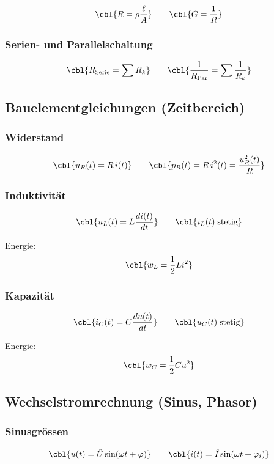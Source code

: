 \[
\cbl{R = \rho \frac{\ell}{A}}
\qquad
\cbl{G = \frac{1}{R}}
\]

\subsubsection{Serien- und Parallelschaltung}

\[
\cbl{R_{\mathrm{Serie}} = \sum R_k}
\qquad
\cbl{\frac{1}{R_{\mathrm{Par}}} = \sum \frac{1}{R_k}}
\]

\subsection{Bauelementgleichungen (Zeitbereich)}

\subsubsection{Widerstand}

\[
\cbl{u_R(t) = R\, i(t)}
\qquad
\cbl{p_R(t) = R\, i^2(t) = \frac{u_R^2(t)}{R}}
\]

\subsubsection{Induktivität}

\[
\cbl{u_L(t) = L \frac{di(t)}{dt}}
\qquad
\cbl{i_L(t) \;\text{stetig}}
\]

Energie:
\[
\cbl{w_L = \frac{1}{2} L i^2}
\]

\subsubsection{Kapazität}

\[
\cbl{i_C(t) = C \frac{du(t)}{dt}}
\qquad
\cbl{u_C(t) \;\text{stetig}}
\]

Energie:
\[
\cbl{w_C = \frac{1}{2} C u^2}
\]

\subsection{Wechselstromrechnung (Sinus, Phasor)}

\subsubsection{Sinusgrössen}

\[
\cbl{u(t) = \hat U \sin(\omega t + \varphi)}
\qquad
\cbl{i(t) = \hat I \sin(\omega t + \varphi_i)}
\]

